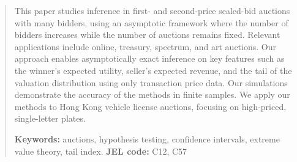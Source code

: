 \documentclass[11pt]{article}
\numberwithin{equation}{section}
\theoremstyle{definition}
\theoremstyle{remark}
\begin{document}
\begin{abstract}


This paper studies inference in first- and second-price sealed-bid auctions with many bidders, using an asymptotic framework where the number of bidders increases while the number of auctions remains fixed. Relevant applications include online, treasury, spectrum, and art auctions. Our approach enables asymptotically exact inference on key features such as the winner’s expected utility, seller’s expected revenue, and the tail of the valuation distribution using only transaction price data. Our simulations demonstrate the accuracy of the methods in finite samples. We apply our methods to Hong Kong vehicle license auctions, focusing on high-priced, single-letter plates.

\flushleft\textbf{Keywords:} auctions, hypothesis testing, confidence intervals, extreme value theory, tail index.
\flushleft\textbf{JEL code:} C12, C57
\end{abstract}
\end{document}
